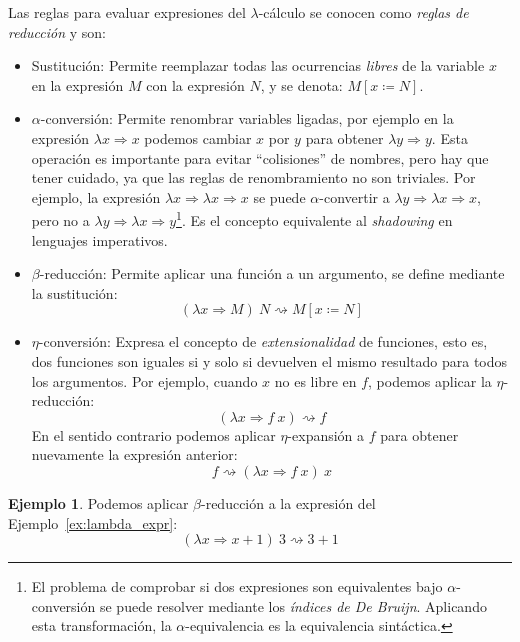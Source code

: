 \documentclass[
  a4paper, 
  10pt, 
  parskip=half, 
  toc=bibliography,
]{scrbook}
\theoremstyle{definition}
\theoremstyle{bolddef}
\newtheorem{example}[theorem]{Ejemplo}
\renewcommand{\mapsto}{\Rightarrow}
\begin{document}
Las reglas para evaluar expresiones del \(\lambda\)-cálculo se conocen como
\emph{reglas de reducción} y son:
\begin{itemize}
  \item Sustitución: Permite reemplazar todas las ocurrencias \emph{libres} de la
    variable \(x\) en la expresión \(M\) con la expresión \(N\), y se denota:
    \(M[x \coloneqq N]\).
  \item \(\alpha\)-conversión: Permite renombrar variables ligadas,
    por ejemplo en la expresión \(\lambda x \mapsto x\) podemos cambiar \(x\) por
    \(y\) para obtener \(\lambda y \mapsto y\). Esta operación es importante para evitar
    \enquote{colisiones} de nombres, pero hay que tener cuidado, ya que las reglas
    de renombramiento no son triviales. Por ejemplo, la expresión
    \(\lambda x \mapsto \lambda x \mapsto x\) se puede \(\alpha\)-convertir a
    \(\lambda y \mapsto \lambda x \mapsto x\), pero no a
    \(\lambda y \mapsto \lambda x \mapsto y\)\footnote{
      El problema de comprobar si dos expresiones son equivalentes bajo
      \(\alpha\)-conversión se puede resolver mediante los \emph{índices de De Bruijn}.
      Aplicando esta transformación, la \(\alpha\)-equivalencia es la
      equivalencia sintáctica.
    }. Es el concepto equivalente
    al \emph{shadowing} en lenguajes imperativos.

  \item \(\beta\)-reducción: Permite aplicar una función a un argumento,
    se define mediante la sustitución:
    \[
    (\lambda x \mapsto M) \ N \rightsquigarrow M[x \coloneqq N]
    \]
  \item \(\eta\)-conversión: Expresa el concepto de \emph{extensionalidad} de funciones,
    esto es, dos funciones son iguales si y solo si devuelven el mismo resultado
    para todos los argumentos. Por ejemplo, cuando \(x\) no es libre en \(f\), 
    podemos aplicar la \(\eta\)-reducción:
    \[
    (\lambda x \mapsto f \ x) \rightsquigarrow f
    \]
    En el sentido contrario podemos aplicar \(\eta\)-expansión a \(f\) para
    obtener nuevamente la expresión anterior:
    \[
    f \rightsquigarrow (\lambda x \mapsto f \ x) \ x
    \]
\end{itemize}

\begin{example}
  Podemos aplicar \(\beta\)-reducción a la expresión del Ejemplo~\ref{ex:lambda_expr}:
  \[
  (\lambda x \mapsto x + 1) \ 3 \rightsquigarrow 3 + 1 
  \]
\end{example}
\end{document}
